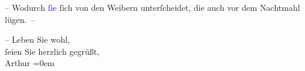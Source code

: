 \pstart
           – Wodurch \textcolor{blue}{ſie}{}\ledrightnote{{$\rightarrow$}\textcolor{blue}{Josefine Lydia von Weisswasser}} ſich von den
               Weibern unterſcheidet, die auch vor dem Nachtmahl lügen. –\pend
           
\pstart
           – Leben Sie wohl, {\\[\baselineskip]}ſeien Sie herzlich gegrüßt, {\\[\baselineskip]}\spacefill\mbox{Arthur}\pend
           \leftskip=0em{}\endnumbering{}  
      